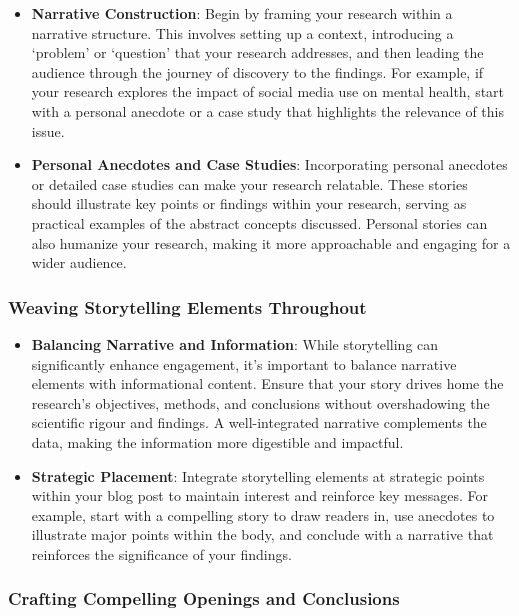 \documentclass[
]{book}
\begin{document}
\begin{itemize}
\item
  \textbf{Narrative Construction}: Begin by framing your research within a narrative structure. This involves setting up a context, introducing a `problem' or `question' that your research addresses, and then leading the audience through the journey of discovery to the findings. For example, if your research explores the impact of social media use on mental health, start with a personal anecdote or a case study that highlights the relevance of this issue.
\item
  \textbf{Personal Anecdotes and Case Studies}: Incorporating personal anecdotes or detailed case studies can make your research relatable. These stories should illustrate key points or findings within your research, serving as practical examples of the abstract concepts discussed. Personal stories can also humanize your research, making it more approachable and engaging for a wider audience.
\end{itemize}

\hypertarget{weaving-storytelling-elements-throughout}{%
\subsubsection*{Weaving Storytelling Elements Throughout}\label{weaving-storytelling-elements-throughout}}

\begin{itemize}
\item
  \textbf{Balancing Narrative and Information}: While storytelling can significantly enhance engagement, it's important to balance narrative elements with informational content. Ensure that your story drives home the research's objectives, methods, and conclusions without overshadowing the scientific rigour and findings. A well-integrated narrative complements the data, making the information more digestible and impactful.
\item
  \textbf{Strategic Placement}: Integrate storytelling elements at strategic points within your blog post to maintain interest and reinforce key messages. For example, start with a compelling story to draw readers in, use anecdotes to illustrate major points within the body, and conclude with a narrative that reinforces the significance of your findings.
\end{itemize}

\hypertarget{crafting-compelling-openings-and-conclusions}{%
\subsubsection*{Crafting Compelling Openings and Conclusions}\label{crafting-compelling-openings-and-conclusions}}
\end{document}
